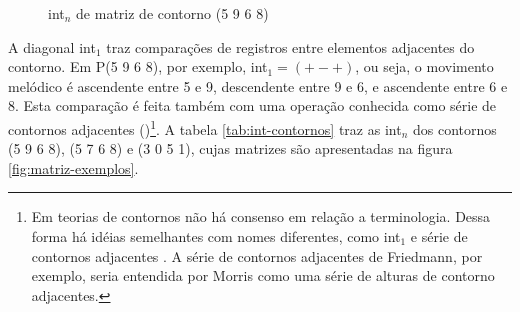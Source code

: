 \begin{figure}
  \centering
  \qquad
  \qquad
  \caption{int$_n$ de matriz de contorno (5 9 6 8)}
  \label{fig:int-exemplos}
\end{figure}

A diagonal int$_1$ traz comparações de registros entre elementos
adjacentes do contorno. Em P(5 9 6 8), por exemplo, int$_1=(+ - +)$,
ou seja, o movimento melódico é ascendente entre 5 e 9, descendente
entre 9 e 6, e ascendente entre 6 e 8. Esta comparação é feita também
com uma operação conhecida como série de contornos adjacentes
()\footnote{Em teorias de contornos não há consenso em relação
  a terminologia. Dessa forma há idéias semelhantes com nomes
  diferentes, como int$_1$ e série de contornos adjacentes
  \cite{friedmann87:response}. A série de contornos adjacentes de
  Friedmann, por exemplo, seria entendida por Morris como uma série de
  alturas de contorno adjacentes.}. A tabela \ref{tab:int-contornos}
traz as int$_n$ dos contornos (5 9 6 8), (5 7 6 8) e (3 0 5 1), cujas
matrizes são apresentadas na figura \ref{fig:matriz-exemplos}.

